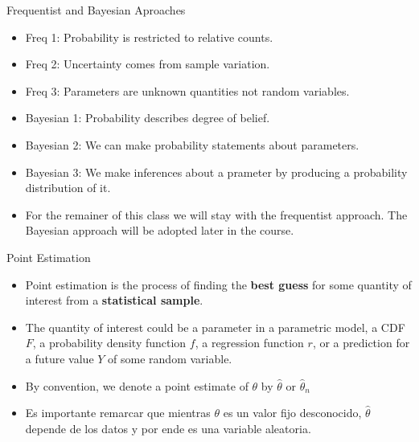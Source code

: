 \documentclass[handout]{beamer}
\begin{document}
\begin{frame}{Frequentist and Bayesian Aproaches}
\scriptsize{
\begin{itemize}
\item Freq 1: Probability is restricted to relative counts.
\item Freq 2: Uncertainty comes from sample variation.
\item Freq 3: Parameters are unknown quantities not random variables.
\item Bayesian 1: Probability describes degree of belief.
\item Bayesian 2: We can make probability statements about parameters.
\item Bayesian 3: We make inferences about a prameter by producing a probability distribution of it.
\item For the remainer of this class we will stay with the frequentist approach. The Bayesian approach will be adopted later in the course.

\end{itemize}


} 
\end{frame}


\begin{frame}{Point Estimation}
\scriptsize{
\begin{itemize}
 \item Point estimation is the process of finding the \textbf{best guess} for some quantity of interest from a \textbf{statistical sample}.
 \item The quantity of interest could be a parameter in a parametric model, a CDF $F$, a probability density function $f$, a regression function $r$, or a prediction for a future value $Y$ of some random variable.
  \item By convention, we denote a point estimate of $\theta$ by $\hat{\theta}$ or $\hat{\theta}_n$ 
 \item Es importante remarcar que mientras $\theta$ es un valor fijo desconocido, $\hat{\theta}$  depende de los datos y por ende es una variable aleatoria. 

\end{itemize}

} 
\end{frame}
\end{document}
